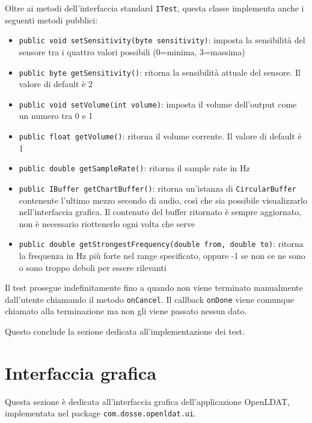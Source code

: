 Oltre ai metodi dell'interfaccia standard \texttt{ITest}, questa classe implementa anche i seguenti metodi pubblici: \begin{itemize}
	\item \texttt{public void setSensitivity(byte sensitivity)}: imposta la sensibilità del sensore tra i quattro valori possibili (0=minima, 3=massima)
	\item \texttt{public byte getSensitivity()}: ritorna la sensibilità attuale del sensore. Il valore di default è 2
	\item \texttt{public void setVolume(int volume)}: imposta il volume dell'output come un numero tra 0 e 1
	\item \texttt{public float getVolume()}: ritorna il volume corrente. Il valore di default è 1
	\item \texttt{public double getSampleRate()}: ritorna il sample rate in Hz
	\item \texttt{public IBuffer getChartBuffer()}: ritorna un'istanza di \texttt{CircularBuffer} contenente l'ultimo mezzo secondo di audio, così che sia possibile visualizzarlo nell'interfaccia grafica. Il contenuto del buffer ritornato è sempre aggiornato, non è necessario riottenerlo ogni volta che serve
	\item \texttt{public double getStrongestFrequency(double from, double to)}: ritorna la frequenza in Hz più forte nel range specificato, oppure -1 se non ce ne sono o sono troppo deboli per essere rilevanti
\end{itemize}

Il test prosegue indefinitamente fino a quando non viene terminato manualmente dall'utente chiamando il metodo \texttt{onCancel}. Il callback \texttt{onDone} viene comunque chiamato alla terminazione ma non gli viene passato nessun dato.

%
%
%
Questo conclude la sezione dedicata all'implementazione dei test.

\section{Interfaccia grafica}
Questa sezione è dedicata all'interfaccia grafica dell'applicazione OpenLDAT, implementata nel package \texttt{com.dosse.openldat.ui}.


